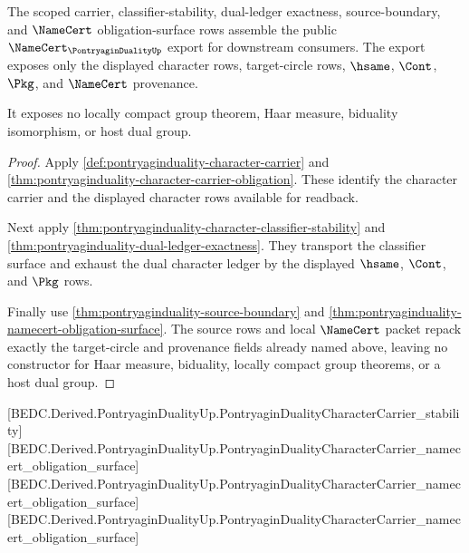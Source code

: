 \begin{theorem}
\label{thm:pontryaginduality-public-character-export}
The scoped carrier, classifier-stability, dual-ledger exactness,
source-boundary, and $\NameCert$ obligation-surface rows assemble the public
$\NameCert_{\PontryaginDualityUp}$ export for downstream consumers. The export
exposes only the displayed character rows, target-circle rows, $\hsame$,
$\Cont$, $\Pkg$, and $\NameCert$ provenance.

It exposes no locally compact group theorem, Haar measure, biduality
isomorphism, or host dual group.
\end{theorem}
\begin{proof}
Apply \autoref{def:pontryaginduality-character-carrier} and
\autoref{thm:pontryaginduality-character-carrier-obligation}. These identify
the character carrier and the displayed character rows available for readback.

Next apply \autoref{thm:pontryaginduality-character-classifier-stability} and
\autoref{thm:pontryaginduality-dual-ledger-exactness}. They transport the
classifier surface and exhaust the dual character ledger by the displayed
$\hsame$, $\Cont$, and $\Pkg$ rows.

Finally use \autoref{thm:pontryaginduality-source-boundary} and
\autoref{thm:pontryaginduality-namecert-obligation-surface}. The source rows
and local $\NameCert$ packet repack exactly the target-circle and provenance
fields already named above, leaving no constructor for Haar measure, biduality,
locally compact group theorems, or a host dual group.
\end{proof}

[BEDC.Derived.PontryaginDualityUp.PontryaginDualityCharacterCarrier\_stability]
[BEDC.Derived.PontryaginDualityUp.PontryaginDualityCharacterCarrier\_namecert\_obligation\_surface]
[BEDC.Derived.PontryaginDualityUp.PontryaginDualityCharacterCarrier\_namecert\_obligation\_surface]
[BEDC.Derived.PontryaginDualityUp.PontryaginDualityCharacterCarrier\_namecert\_obligation\_surface]
\begin{closurestatus}{\PontryaginDualityUp}
  \theoryclosure{\publicClosure}
  \formalstatus{\axiomCleanV}
\end{closurestatus}
